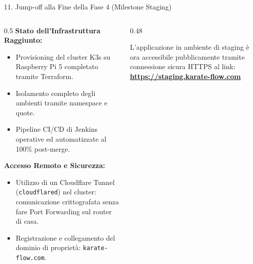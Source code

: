 \documentclass[aspectratio=169, 10pt]{beamer}
\begin{document}
\begin{frame}{11. Jump-off alla Fine della Fase 4 (Milestone Staging)}
  \begin{columns}
    \begin{column}{0.5\textwidth}
      \textbf{Stato dell'Infrastruttura Raggiunto:}
      \begin{itemize}
        \item Provisioning del cluster K3s su Raspberry Pi 5 completato tramite Terraform.
        \item Isolamento completo degli ambienti tramite namespace e quote.
        \item Pipeline CI/CD di Jenkins operative ed automatizzate al 100\% post-merge.
      \end{itemize}
      \vspace{0.3cm}
      \textbf{Accesso Remoto e Sicurezza:}
      \begin{itemize}
        \item Utilizzo di un \alert{Cloudflare Tunnel} (\texttt{cloudflared}) nel cluster: comunicazione crittografata senza fare Port Forwarding sul router di casa.
        \item Registrazione e collegamento del dominio di proprietà: \texttt{karate-flow.com}.
      \end{itemize}
    \end{column}
    \begin{column}{0.48\textwidth}
      \begin{tcolorbox}[colback=karateRed!10, colframe=karateRed, title=Staging Online]
        L'applicazione in ambiente di staging è ora accessibile pubblicamente tramite connessione sicura HTTPS al link:
        \vspace{0.3cm}
        \centering
        \textbf{\url{https://staging.karate-flow.com}}
      \end{tcolorbox}
    \end{column}
  \end{columns}
\end{frame}
\end{document}
